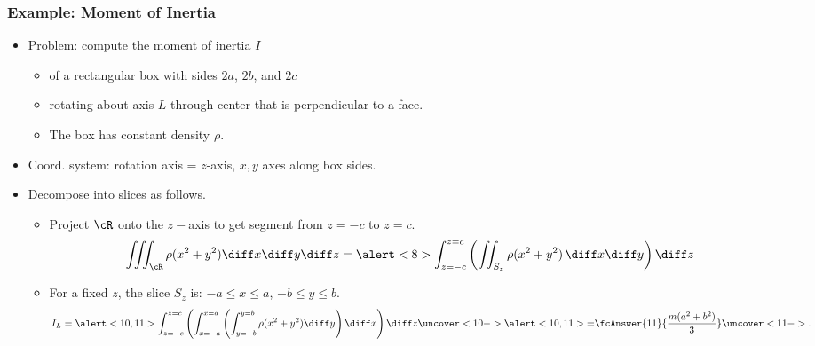\begin{frame}
\frametitle{Example: Moment of Inertia}
\begin{itemize}
\item Problem: compute the moment of inertia $I$
\begin{itemize}
\item \alert<2>{of a rectangular box with sides $2a$, $2b$, and $2c$}
\item \alert<3>{rotating about axis $L$ through center that is perpendicular to a face.}
\item \alert<4>{The box has constant density $\rho$.} 
\end{itemize}
\item<5-> Coord. system: rotation axis = $z$-axis, $x,y$ axes along box sides.
\item<7-> Decompose into slices as follows.
\begin{itemize}
\item<7-> Project $\cR$ onto the $z-$axis \alert<8>{to get segment from $z=-c$ to $z=c$.}
\[
\iiint_{\cR} \rho (x^2+y^2) \diff x \diff y \diff z = \alert<8>{\int_{z=-c}^{z=c}} \left( \iint_{S_z} \rho (x^2+y^2)\, \diff x \diff y \right) \diff z
\]    
\item<9-> For a fixed $z$, the slice $S_z$ is: $-a \leq x \leq a$, $-b \leq  y \leq  b$.
\[
I_L = \alert<10,11>{ \int_{z=-c}^{z=c} \left(\int_{x=-a}^{x=a} \left( \int_{y=-b}^{y=b} \rho (x^2+y^2)  \diff y \right)  \diff x\right)  \diff z} \uncover<10->{\alert<10,11>{=}} \fcAnswer{11}{\frac{m(a^2+b^2)}{3}} \uncover<11->{.}
\]
%

\end{itemize}
  \end{itemize}
\end{frame}